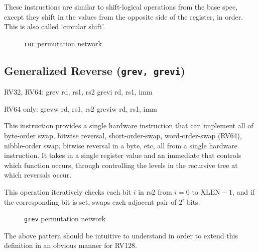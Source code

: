 These instructions are similar to shift-logical operations from the base
spec, except they shift in the values from the opposite side of the
register, in order. This is also called `circular shift'.




\begin{figure}[t]
\begin{center}

\end{center}
\caption{\texttt{ror} permutation network}
\label{permnet-ror}
\end{figure}

\subsection{Generalized Reverse (\texttt{grev,\ grevi})}
\label{grev}

\begin{rvb}
  RV32, RV64:
    grev  rd, rs1, rs2
    grevi rd, rs1, imm

  RV64 only:
    grevw  rd, rs1, rs2
    greviw rd, rs1, imm
\end{rvb}

This instruction provides a single hardware instruction that can implement all
of byte-order swap, bitwise reversal, short-order-swap, word-order-swap
(RV64), nibble-order swap, bitwise reversal in a byte, etc, all from a single
hardware instruction. It takes in a single register value and an immediate that
controls which function occurs, through controlling the levels in the recursive
tree at which reversals occur.

This operation iteratively checks each bit $i$ in rs2 from $i=0$ to
$\textrm{XLEN}-1$, and if the corresponding bit is set, swaps each adjacent
pair of $2^i$ bits.

\begin{figure}[t]
\begin{center}

\end{center}
\caption{\texttt{grev} permutation network}
\label{permnet-grev}
\end{figure}



The above pattern should be intuitive to understand in order to extend
this definition in an obvious manner for RV128.

